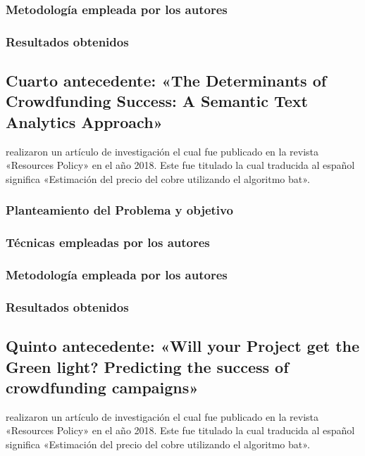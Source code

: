 \subsubsection{Metodología empleada por los autores}


\subsubsection{Resultados obtenidos}



\subsection{Cuarto antecedente: «The Determinants of Crowdfunding Success: A Semantic Text Analytics Approach» \citep*{pr_yuan2016textanalytics}}
\citeauthor{pr_yuan2016textanalytics} realizaron un artículo de investigación el cual fue publicado en la revista «Resources Policy» en el año 2018. Este fue titulado  la cual traducida al español significa «Estimación del precio del cobre utilizando el algoritmo bat».

\subsubsection{Planteamiento del Problema y objetivo }


\subsubsection{Técnicas empleadas por los autores}


\subsubsection{Metodología empleada por los autores}


\subsubsection{Resultados obtenidos}



\subsection{Quinto antecedente: «Will your Project get the Green light? Predicting the success of crowdfunding campaigns» \citep*{pr_chen2015predcrowd}}
\citeauthor{pr_chen2015predcrowd} realizaron un artículo de investigación el cual fue publicado en la revista «Resources Policy» en el año 2018. Este fue titulado  la cual traducida al español significa «Estimación del precio del cobre utilizando el algoritmo bat».

